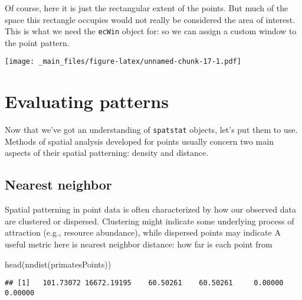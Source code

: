 \documentclass[
]{book}
\newenvironment{Shaded}{\begin{snugshade}}{\end{snugshade}}
\newcommand{\FunctionTok}[1]{\textcolor[rgb]{0.00,0.00,0.00}{#1}}
\newcommand{\NormalTok}[1]{#1}
\newcommand{\OtherTok}[1]{\textcolor[rgb]{0.56,0.35,0.01}{#1}}
\newcommand{\SpecialCharTok}[1]{\textcolor[rgb]{0.00,0.00,0.00}{#1}}
\begin{document}
Of course, here it is just the rectangular extent of the points. But much of the space this rectangle occupies would not really be considered the area of interest. This is what we need the \texttt{ecWin} object for: so we can assign a custom window to the point pattern.

\begin{Shaded}
\end{Shaded}

\texttt{[image: \_main\_files/figure-latex/unnamed-chunk-17-1.pdf]}

\hypertarget{evaluating-patterns}{%
\chapter{Evaluating patterns}\label{evaluating-patterns}}

Now that we've got an understanding of \texttt{spatstat} objects, let's put them to use. Methods of spatial analysis developed for points usually concern two main aspects of their spatial patterning: density and distance.

\hypertarget{nearest-neighbor}{%
\section{Nearest neighbor}\label{nearest-neighbor}}

Spatial patterning in point data is often characterized by how our observed data are clustered or dispersed. Clustering might indicate some underlying process of attraction (e.g., resource abundance), while dispersed points may indicate A useful metric here is nearest neighbor distance: how far is each point from

\begin{Shaded}
\begin{Highlighting}[]
\FunctionTok{head}\NormalTok{(}\FunctionTok{nndist}\NormalTok{(primatesPoints))}
\end{Highlighting}
\end{Shaded}

\begin{verbatim}
## [1]   101.73072 16672.19195    60.50261    60.50261     0.00000     0.00000
\end{verbatim}
\end{document}
